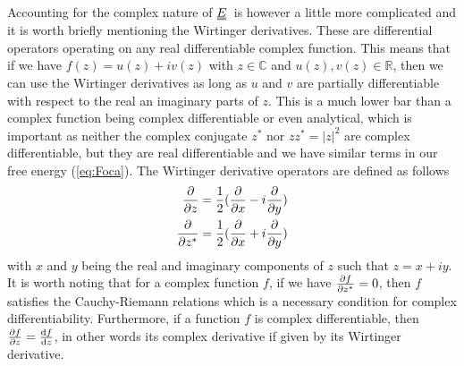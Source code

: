 \documentclass[12pt]{article}
\newcommand{\duf}[2]{\stackunder[0.5pt]{\stackunder[0.8pt]{\stackunder[1pt]{\ensuremath{#1}}{\rule{\widthof{\ensuremath{#2}}*\real{0.9}}{.1ex}}}{\rule{\widthof{\ensuremath{#2}}*\real{0.9}}{.1ex}}}{}}
\newcommand{\du}[1]{\duf{#1}{#1}}
\newcommand{\EE}{\ensuremath{\du{E}}}
\begin{document}
        Accounting for the complex nature of \EE\ is however a little more complicated and it is worth briefly mentioning the Wirtinger derivatives\cite{haslingerComplexAnalysisFunctional2017}.
        These are differential operators operating on any real differentiable complex function.
        This means that if we have $f(z) = u(z) + i v(z)$ with $z \in \mathbb{C}$ and $u(z), v(z) \in \mathbb{R}$, then we can use the Wirtinger derivatives as long as $u$ and $v$ are partially differentiable with respect to the real an imaginary parts of $z$.
        This is a much lower bar than a complex function being complex differentiable or even analytical, which is important as neither the complex conjugate $z^*$ nor $z z^* = |z|^2$ are complex differentiable, but they are real differentiable and we have similar terms in our free energy (\cref{eq:Foca}).
        The Wirtinger derivative operators are defined as follows
        \begin{align}
            \pdv{z} &= \frac{1}{2}(\pdv{x} - i\pdv{y}) \\
            \pdv{z^*} &= \frac{1}{2}(\pdv{x} + i\pdv{y})
        \end{align}
        with $x$ and $y$ being the real and imaginary components of $z$ such that $z = x + iy$.
        It is worth noting that for a complex function $f$, if we have $\pdv{f}{z^*}=0$, then $f$ satisfies the Cauchy-Riemann relations which is a necessary condition for complex differentiability.
        Furthermore, if a function $f$ is complex differentiable, then $\pdv{f}{z} = \dv{f}{z}$, in other words its complex derivative if given by its Wirtinger derivative.
\end{document}
